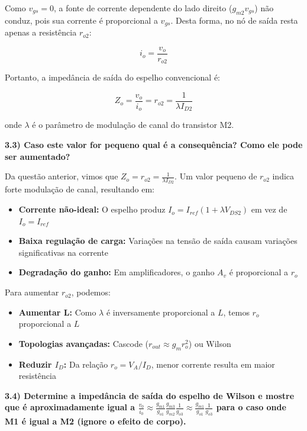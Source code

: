 ﻿\documentclass[12pt,a4paper]{article}
\begin{document}
Como $v_{gs} = 0$, a fonte de corrente dependente do lado direito ($g_{m2}v_{gs}$) não conduz, pois sua corrente é proporcional a $v_{gs}$. Desta forma, no nó de saída resta apenas a resistência $r_{o2}$:

\begin{equation*}
i_o = \frac{v_o}{r_{o2}}
\end{equation*}

Portanto, a impedância de saída do espelho convencional é:

\begin{equation}
Z_o = \frac{v_o}{i_o} = r_{o2} = \frac{1}{\lambda I_{D2}}
\end{equation}

onde $\lambda$ é o parâmetro de modulação de canal do transistor M2.

\textbf{3.3) Caso este valor for pequeno qual é a consequência? Como ele pode ser aumentado?}

Da questão anterior, vimos que $Z_o = r_{o2} = \frac{1}{\lambda I_{D2}}$. Um valor pequeno de $r_{o2}$ indica forte modulação de canal, resultando em:

\begin{itemize}
    \item \textbf{Corrente não-ideal:} O espelho produz $I_o = I_{ref}(1 + \lambda V_{DS2})$ em vez de $I_o = I_{ref}$
    \item \textbf{Baixa regulação de carga:} Variações na tensão de saída causam variações significativas na corrente
    \item \textbf{Degradação do ganho:} Em amplificadores, o ganho $A_v$ é proporcional a $r_o$
\end{itemize}

Para aumentar $r_{o2}$, podemos:

\begin{itemize}
    \item \textbf{Aumentar L:} Como $\lambda$ é inversamente proporcional a $L$, temos $r_o$ proporcional a $L$
    \item \textbf{Topologias avançadas:} Cascode ($r_{out} \approx g_m r_o^2$) ou Wilson
    \item \textbf{Reduzir $I_D$:} Da relação $r_o = V_A/I_D$, menor corrente resulta em maior resistência
\end{itemize}

\textbf{3.4) Determine a impedância de saída do espelho de Wilson e mostre que é aproximadamente igual a $\frac{v_{0}}{i_{0}} \approx \frac{g_{m1}}{g_{o1}} \frac{g_{m3}}{g_{m2}} \frac{1}{g_{o3}} \approx \frac{g_{m1}}{g_{o1}} \frac{1}{g_{o3}}$ para o caso onde M1 é igual a M2 (ignore o efeito de corpo).}
\end{document}
